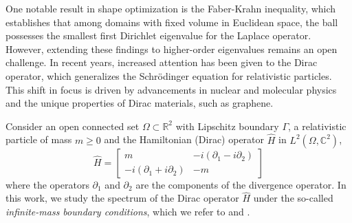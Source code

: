 \documentclass[5p,authoryear]{elsarticle}
\begin{document}
One notable result in shape optimization is the Faber-Krahn inequality, which establishes that among domains with fixed volume in Euclidean space, the ball possesses the smallest first Dirichlet eigenvalue for the Laplace operator. However, extending these findings to higher-order eigenvalues remains an open challenge. In recent years, increased attention has been given to the Dirac operator, which generalizes the Schrödinger equation for relativistic particles. This shift in focus is driven by advancements in nuclear and molecular physics and the unique properties of Dirac materials, such as graphene.


Consider an open connected set \(\Omega \subset \mathbb{R}^2\) with Lipschitz boundary \(\Gamma\), a relativistic particle of mass \(m \geq 0\) and the Hamiltonian (Dirac) operator \(\hat{H}\) in \(L^2(\Omega, \mathbb{C}^2)\),
\begin{equation*}
	\hat{H} = \begin{bmatrix}
		m & -i(\partial_1 - i \partial_2)\\
		-i(\partial_1 + i \partial_2) & -m
	\end{bmatrix}
\end{equation*}
where the operators \(\partial_1\) and \(\partial_2\) are the components of the divergence operator. In this work, we study the spectrum of the Dirac operator \(\hat{H}\) under the so-called \textit{infinite-mass boundary conditions}, which we refer to \cite{lotoreichik2019sharp} and \cite{briet2022spectral}.
\end{document}
